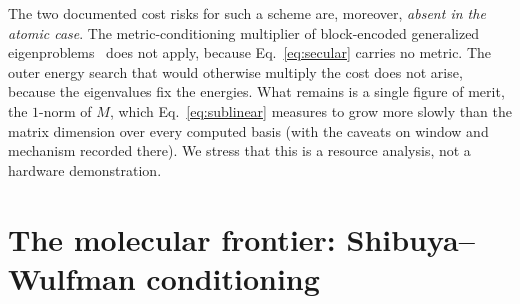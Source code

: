 \documentclass[aps,pra,twocolumn,superscriptaddress,longbibliography]{revtex4-2}
\begin{document}
The two documented cost risks for such a scheme are, moreover, \emph{absent in
the atomic case}.  The metric-conditioning multiplier of block-encoded
generalized eigenproblems~\cite{liang2022,baek2023} does not apply, because
Eq.~\eqref{eq:secular} carries no metric.  The outer energy search that would
otherwise multiply the cost does not arise, because the eigenvalues fix the
energies.  What remains is a single figure of merit, the $1$-norm of $M$, which
Eq.~\eqref{eq:sublinear} measures to grow more slowly than the matrix dimension
over every computed basis (with the caveats on window and mechanism recorded
there).  We stress that this is a
resource analysis, not a hardware demonstration.

\section{The molecular frontier: Shibuya--Wulfman conditioning}
\label{sec:molecular}
\end{document}
